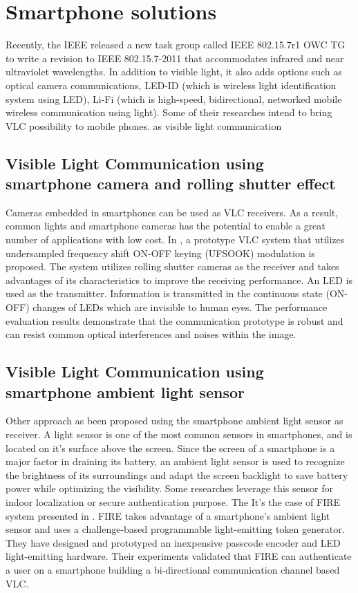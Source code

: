 \section{Smartphone solutions}

Recently, the IEEE released a new task group called IEEE 802.15.7r1 OWC TG to write a revision to IEEE 802.15.7-2011 that accommodates infrared and near ultraviolet wavelengths. In addition to visible light, it also adds options such as optical camera communications, LED-ID (which is wireless light identification system using LED), Li-Fi (which is high-speed, bidirectional, networked mobile wireless communication using light). Some of their researches intend to bring VLC possibility to mobile phones.
 as visible light communication   
\subsection{Visible Light Communication using smartphone camera and rolling shutter effect}

Cameras embedded in smartphones can be used as VLC receivers. As a result, common lights and smartphone cameras has the potential to enable a great number
of applications with low cost. In \citep{rolling}, a prototype VLC
system that utilizes undersampled frequency shift ON-OFF keying (UFSOOK) modulation is proposed. The system utilizes rolling shutter cameras as the receiver and takes advantages of its characteristics to improve the receiving performance. An LED is used as the transmitter.
Information is transmitted in the continuous state (ON-OFF) changes of LEDs which are invisible to human eyes. 
The performance evaluation results demonstrate that the communication prototype is robust and can resist common optical interferences and noises within the image.

\subsection{Visible Light Communication using smartphone ambient light sensor}

Other approach as been proposed using the smartphone ambient light sensor as receiver. A light sensor is one of the most common sensors in smartphones, and is located on it’s surface above the screen. Since the screen of a smartphone is a major factor in draining its battery, an ambient light sensor is used to recognize the brightness of its surroundings and adapt the screen backlight to save battery power while optimizing the visibility. Some researches leverage this sensor for indoor localization or secure authentication purpose.  The It's the case of FIRE system presented in \citep{ambsensorsecure}. FIRE takes advantage of a smartphone’s ambient light sensor and uses a challenge-based programmable light-emitting token generator. They have designed and prototyped an inexpensive passcode encoder and LED light-emitting hardware. Their experiments validated that FIRE can authenticate a user on a smartphone building a bi-directional communication channel based VLC.

